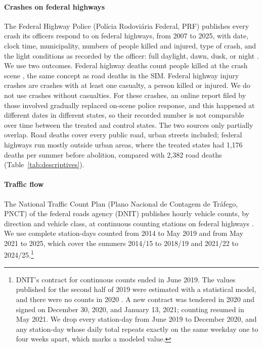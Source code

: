 \paragraph{Crashes on federal highways}

The Federal Highway Police (Pol\'icia Rodovi\'aria Federal, PRF) publishes every crash its officers respond to on federal highways, from 2007 to 2025, with date, clock time, municipality, numbers of people killed and injured, type of crash, and the light conditions as recorded by the officer: full daylight, dawn, dusk, or night \citep{prf2025dados}. We use two outcomes. Federal highway deaths count people killed at the crash scene \citep{prf2025anuario}, the same concept as road deaths in the SIM. Federal highway injury crashes are crashes with at least one casualty, a person killed or injured. We do not use crashes without casualties. For these crashes, an online report filed by those involved gradually replaced on-scene police response, and this happened at different dates in different states, so their recorded number is not comparable over time between the treated and control states. The two sources only partially overlap. Road deaths cover every public road, urban streets included; federal highways run mostly outside urban areas, where the treated states had 1,176 deaths per summer before abolition, compared with 2,382 road deaths (Table~\ref{tab:descriptives}).

\paragraph{Traffic flow}

The National Traffic Count Plan (Plano Nacional de Contagem de Tr\'afego, PNCT) of the federal roads agency (DNIT) publishes hourly vehicle counts, by direction and vehicle class, at continuous counting stations on federal highways \citep{dnit2025pnct}. We use complete station-days counted from 2014 to May 2019 and from May 2021 to 2025, which cover the summers 2014/15 to 2018/19 and 2021/22 to 2024/25.\footnote{DNIT's contract for continuous counts ended in June 2019. The values published for the second half of 2019 were estimated with a statistical model, and there were no counts in 2020 \citep[p.~7]{dnit2020nota}. A new contract was tendered in 2020 \citep{dnit2020edital} and signed on December 30, 2020, and January 13, 2021; counting resumed in May 2021. We drop every station-day from June 2019 to December 2020, and any station-day whose daily total repeats exactly on the same weekday one to four weeks apart, which marks a modeled value.}

